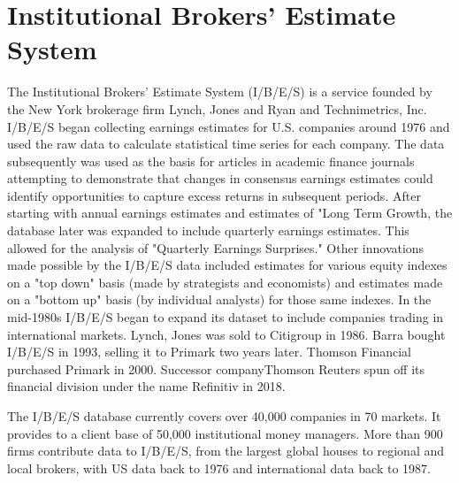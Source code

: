 
\chapter{Institutional Brokers' Estimate System} %

\label{AppendixA} %


The Institutional Brokers' Estimate System (I/B/E/S) is a service founded by the New York brokerage firm Lynch, Jones and Ryan and Technimetrics, Inc. I/B/E/S began collecting earnings estimates for U.S. companies around 1976 and used the raw data to calculate statistical time series for each company. The data subsequently was used as the basis for articles in academic finance journals attempting to demonstrate that changes in consensus earnings estimates could identify opportunities to capture excess returns in subsequent periods. After starting with annual earnings estimates and estimates of "Long Term Growth, the database later was expanded to include quarterly earnings estimates. This allowed for the analysis of "Quarterly Earnings Surprises." Other innovations made possible by the I/B/E/S data included estimates for various equity indexes on a "top down" basis (made by strategists and economists) and estimates made on a "bottom up" basis (by individual analysts) for those same indexes. In the mid-1980s I/B/E/S began to expand its dataset to include companies trading in international markets. Lynch, Jones was sold to Citigroup in 1986. Barra bought I/B/E/S in 1993, selling it to Primark two years later. Thomson Financial purchased Primark in 2000. Successor companyThomson Reuters spun off its financial division under the name Refinitiv in 2018.

The I/B/E/S database currently covers over 40,000 companies in 70 markets. It provides to a client base of 50,000 institutional money managers. More than 900 firms contribute data to I/B/E/S, from the largest global houses to regional and local brokers, with US data back to 1976 and international data back to 1987.